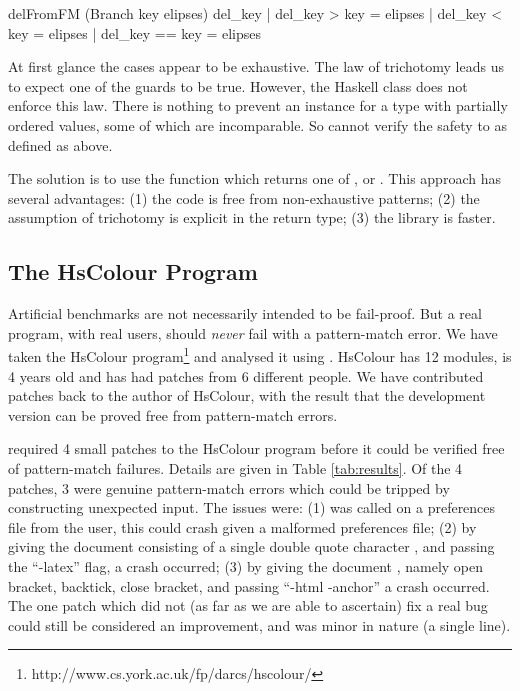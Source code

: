 \begin{code}
delFromFM (Branch key elipses) del_key  | del_key  >   key = elipses
                                        | del_key  <   key = elipses
                                        | del_key  ==  key = elipses
\end{code}

At first glance the cases appear to be exhaustive. The law of trichotomy leads us to expect one of the guards to be true. However, the Haskell  class does not enforce this law. There is nothing to prevent an instance for a type with partially ordered values, some of which are incomparable. So \catch{} cannot verify the safety to  as defined as above.

The solution is to use the  function which returns one of ,  or . This approach has several advantages: (1) the code is free from non-exhaustive patterns; (2) the assumption of trichotomy is explicit in the return type; (3) the library is faster.


\subsection{The HsColour Program}
\label{sec:hscolour}

Artificial benchmarks are not necessarily intended to be fail-proof. But a real program, with real users, should \textit{never} fail with a pattern-match error. We have taken the HsColour program\footnote{http://www.cs.york.ac.uk/fp/darcs/hscolour/} and analysed it using \catch{}. HsColour has 12 modules, is 4 years old and has had patches from 6 different people.
We have contributed patches back to the author of HsColour, with the result that the development version can be proved free from pattern-match errors.

\catch{} required 4 small patches to the HsColour program before it could be verified free of pattern-match failures. Details are given in Table \ref{tab:results}. Of the 4 patches, 3 were genuine pattern-match errors which could be tripped by constructing unexpected input. The issues were: (1)  was called on a preferences file from the user, this could crash given a malformed preferences file; (2) by giving the document consisting of a single double quote character , and passing the ``-latex'' flag, a crash occurred; (3) by giving the document , namely open bracket, backtick, close bracket, and passing ``-html -anchor'' a crash occurred. The one patch which did not (as far as we are able to ascertain) fix a real bug could still be considered an improvement, and was minor in nature (a single line).

